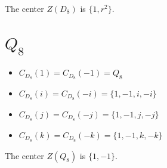 \documentclass{article}
\begin{document}
The center $Z(D_8)$ is $\{ 1, r^2 \}$.

\section*{$Q_8$}

\begin{itemize}
    \item $C_{D_8}(1) = C_{D_8}(-1) = Q_8$
    \item $C_{D_8}(i) = C_{D_8}(-i) = \{ 1, -1, i, -i \}$
    \item $C_{D_8}(j) = C_{D_8}(-j) = \{ 1, -1, j, -j \}$
    \item $C_{D_8}(k) = C_{D_8}(-k) = \{ 1, -1, k, -k \}$
\end{itemize}

The center $Z(Q_8)$ is $\{ 1, -1 \}$.
\end{document}
